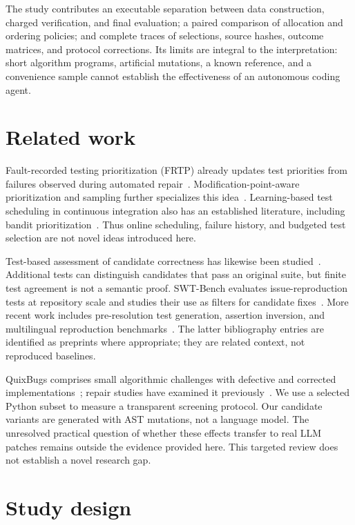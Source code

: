 \documentclass[10pt]{article}
\begin{document}
The study contributes an executable separation between data construction, charged verification, and final evaluation; a paired comparison of allocation and ordering policies; and complete traces of selections, source hashes, outcome matrices, and protocol corrections. Its limits are integral to the interpretation: short algorithm programs, artificial mutations, a known reference, and a convenience sample cannot establish the effectiveness of an autonomous coding agent.

\section{Related work}
Fault-recorded testing prioritization (FRTP) already updates test priorities from failures observed during automated repair~\cite{qi2013frtp}. Modification-point-aware prioritization and sampling further specializes this idea~\cite{yazhini2020mptps}. Learning-based test scheduling in continuous integration also has an established literature, including bandit prioritization~\cite{lima2020coleman}. Thus online scheduling, failure history, and budgeted test selection are not novel ideas introduced here.

Test-based assessment of candidate correctness has likewise been studied~\cite{xiong2018patchcorrectness,ye2021assessment}. Additional tests can distinguish candidates that pass an original suite, but finite test agreement is not a semantic proof. SWT-Bench evaluates issue-reproduction tests at repository scale and studies their use as filters for candidate fixes~\cite{mundler2024swtbench}. More recent work includes pre-resolution test generation, assertion inversion, and multilingual reproduction benchmarks~\cite{ahmed2024tddbench,khatib2025assertflip,kusama2026multiswt}. The latter bibliography entries are identified as preprints where appropriate; they are related context, not reproduced baselines.

QuixBugs comprises small algorithmic challenges with defective and corrected implementations~\cite{lin2017quixbugs}; repair studies have examined it previously~\cite{ye2021quixbugs}. We use a selected Python subset to measure a transparent screening protocol. Our candidate variants are generated with AST mutations, not a language model. The unresolved practical question of whether these effects transfer to real LLM patches remains outside the evidence provided here. This targeted review does not establish a novel research gap.

\section{Study design}
\end{document}
